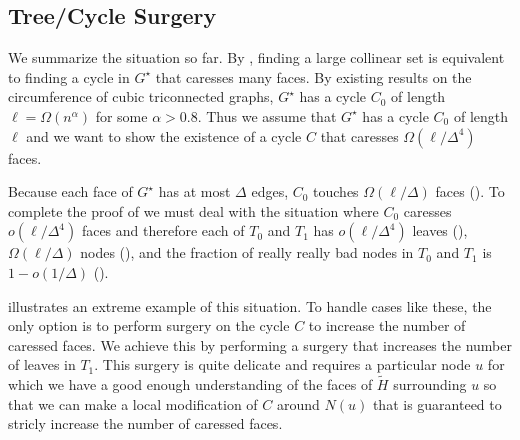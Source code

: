 \documentclass{patmorin}
\newcommand{\dual}[1]{{#1}^\star}
\begin{document}
%


\subsection{Tree/Cycle Surgery}

We summarize the situation so far.  By , finding a large collinear set is equivalent to finding a cycle in $\dual{G}$ that caresses many faces.  By existing results on the circumference of cubic triconnected graphs, $\dual{G}$ has a cycle $C_0$ of length $\ell=\Omega(n^{\alpha})$ for some $\alpha > 0.8$.  Thus we assume that $\dual{G}$ has a cycle $C_0$ of length $\ell$ and we want to show the existence of a cycle $C$ that caresses $\Omega(\ell/\Delta^4)$ faces.

Because each face of $\dual{G}$ has at most $\Delta$ edges, $C_0$ touches $\Omega(\ell/\Delta)$ faces ().  To complete the proof of  we must deal with the situation where $C_0$ caresses $o(\ell/\Delta^4)$ faces and therefore each of $T_0$ and $T_1$ has $o(\ell/\Delta^4)$ leaves (), $\Omega(\ell/\Delta)$ nodes (), and the fraction of really really bad nodes in $T_0$ and $T_1$ is $1-o(1/\Delta)$ ().

 illustrates an extreme example of this situation.  To handle cases like these, the only option is to perform surgery on the cycle $C$ to increase the number of caressed faces.  We achieve this by performing a surgery that increases the number of leaves in $T_1$. This surgery is quite delicate and requires a particular node $u$ for which we have a good enough understanding of the faces of $\tilde{H}$ surrounding $u$ so that we can make a local modification of $C$ around $N(u)$ that is guaranteed to stricly increase the number of caressed faces.
\end{document}
